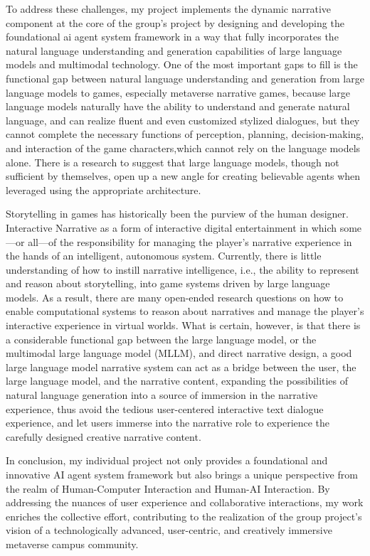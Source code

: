 To address these challenges, my project implements the dynamic narrative component at the core of the group's project by designing and developing the foundational ai agent system framework in a way that fully incorporates the natural language understanding and generation capabilities of large language models and multimodal technology.
One of the most important gaps to fill is the functional gap between natural language understanding and generation from large language models to games, especially metaverse narrative games, because large language models naturally have the ability to understand and generate natural language, and can realize fluent and even customized stylized dialogues, 
but they cannot complete the necessary functions of perception, planning, decision-making, and interaction of the game characters,which cannot rely on the language models alone. 
There is a research to suggest that large language models, though not sufficient by themselves, open up a new angle for creating believable agents when leveraged using the appropriate architecture\cite{park2023generative}. 

Storytelling in games has historically been the purview of the human designer. Interactive Narrative as a form of interactive digital entertainment in which some—or all—of the responsibility for managing the player’s narrative experience in the hands of an intelligent, autonomous system\cite{riedl2012interactive}. 
Currently, there is little understanding of how to instill narrative intelligence, i.e., the ability to represent and reason about storytelling, into game systems driven by large language models. 
As a result, there are many open-ended research questions on how to enable computational systems to reason about narratives and manage the player's interactive experience in virtual worlds. 
What is certain, however, is that there is a considerable functional gap between the large language model, or the multimodal large language model (MLLM), and direct narrative design, a good large language model narrative system can act as a bridge between the user, the large language model, and the narrative content, 
expanding the possibilities of natural language generation into a source of immersion in the narrative experience, thus avoid the tedious user-centered interactive text dialogue experience, 
and let users immerse into the narrative role to experience the carefully designed creative narrative content.

In conclusion, my individual project not only provides a foundational and innovative AI agent system framework but also brings a unique perspective from the realm of Human-Computer Interaction and Human-AI Interaction. 
By addressing the nuances of user experience and collaborative interactions, my work enriches the collective effort, contributing to the realization of the group project's vision of a technologically advanced, user-centric, and creatively immersive metaverse campus community.

